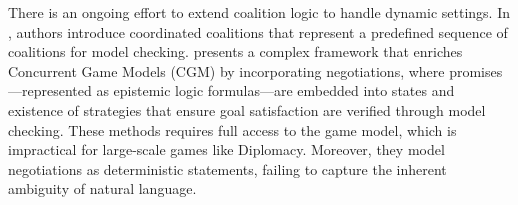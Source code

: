 There is an ongoing effort to extend coalition logic to handle dynamic settings. 
In \citep{umar2016coordinated}, authors introduce coordinated coalitions that represent a predefined sequence of coalitions for model checking.
\citep{guelev2023temporary} presents a complex framework that enriches Concurrent Game Models (CGM) by incorporating negotiations, where promises---represented as epistemic logic formulas---are embedded into states and existence of strategies that ensure goal satisfaction are verified through model checking. 
These methods requires full access to the game model, which is impractical for large-scale games like Diplomacy. 
Moreover, they model negotiations as deterministic statements, failing to capture the inherent ambiguity of natural language.





